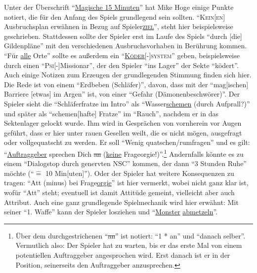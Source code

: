 \documentclass[a5paper,pagesize,numbers=noenddot]{scrbook}
\begin{document}
Unter der Überschrift \enquote{\uline{Magische 15 Minuten}} hat Mike Hoge einige Punkte notiert, die für den Anfang des Spiels grundlegend sein sollten.
\enquote{\textsc{Kein[en]} Ausbruchsplan erwähnen in Bezug auf Spieler\textsc{\uline{ziel}}}, steht hier beispielsweise geschrieben.
Stattdessen sollte der Spieler erst im Laufe des Spiels \enquote{durch [die] Gildenpläne} mit den verschiedenen Ausbruchsvorhaben in Berührung kommen.
\enquote{Für \uline{alle} Orte} sollte es außerdem ein \enquote{\textsc{\uline{Köder}}[-]\textsc{system}} geben, beispielsweise durch einen \enquote{\textsc{Psi}[-]Missionar}, der den Spieler \enquote{ins Lager} der Sekte \enquote{ködert}.
Auch einige Notizen zum Erzeugen der grundlegenden Stimmung finden sich hier.
Die Rede ist von einem \enquote{Erdbeben (Schläfer)}, davon, dass mit der \enquote{mag[ischen] Barriere [etwas] im Argen} ist, von einer \enquote{Gefahr (Dämonenbeschwörer)}.
Der Spieler sieht die \enquote{Schläferfratze im Intro} als \enquote{Wasser\uline{schemen} (durch Aufprall?)} und später als \enquote {schemen[hafte] Fratze} im \enquote{Rauch}, nachdem er in das Sektenlager gelockt wurde.
Ihm wird in Gesprächen von vornherein vor Augen geführt, dass er hier unter rauen Gesellen weilt, die es nicht mögen, ausgefragt oder vollgequatscht zu werden.
Er soll \enquote{Wenig quatschen/rumfragen} und es gilt: \enquote{\uline{Auftraggeber} sprechen Dich \sout{an} (\uline{keine} Frageorgie!)}.\footnote{Über dem durchgestrichenen \enquote{\sout{an}} ist notiert: \enquote{1 * an} und \enquote{danach selber}. Vermutlich also: Der Spieler hat zu warten, bis er das erste Mal von einem potentiellen Auftraggeber angesprochen wird. Erst danach ist er in der Position, seinerseits den Auftraggeber anzusprechen.}
Andernfalls könnte es zu einem \enquote{Dialogstop durch genervten NSC} kommen, der dann \enquote{3 Stunden Ruhe} möchte (\enquote{$\hat{=}$ 10 Min[uten]}).
Oder der Spieler hat weitere Konsequenzen zu tragen:
\enquote{Att (minus) bei Frage\uline{orgie}} ist hier vermerkt, wobei nicht ganz klar ist, wofür \enquote{Att} steht; eventuell ist damit Attitüde gemeint, vielleicht aber auch Attribut. %
Auch eine ganz grundlegende Spielmechanik wird hier erwähnt:
Mit seiner \enquote{1. Waffe} kann der Spieler losziehen und \enquote{\uline{Monster} \uline{abmetzeln}}.


\end{document}
